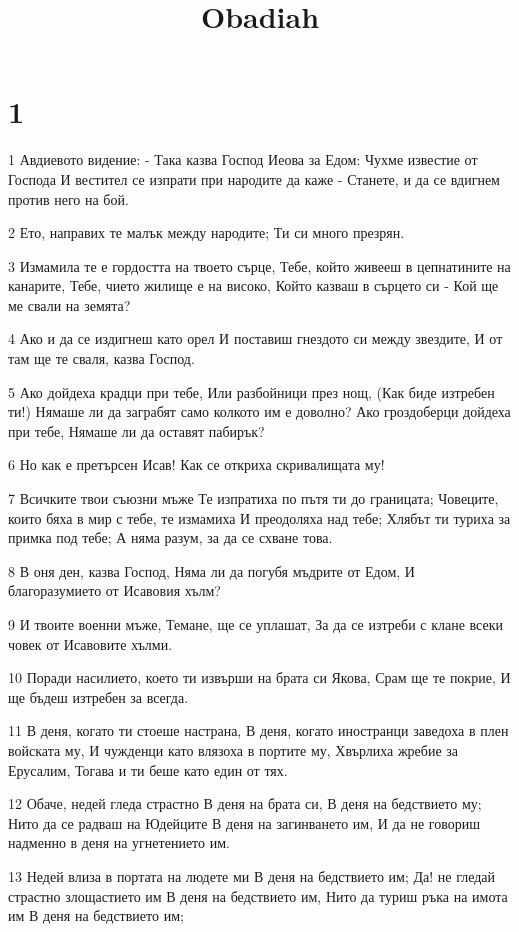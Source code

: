 

\title{Obadiah}


\chapter{1}

\par 1 Авдиевото видение: - Така казва Господ Иеова за Едом: Чухме известие от Господа И вестител се изпрати при народите да каже -  Станете, и да се вдигнем против него на бой.
\par 2 Ето, направих те малък между народите; Ти си много презрян.
\par 3 Измамила те е гордостта на твоето сърце, Тебе, който живееш в цепнатините на канарите, Тебе, чието жилище е на високо, Който казваш в сърцето си -  Кой ще ме свали на земята?
\par 4 Ако и да се издигнеш като орел И поставиш гнездото си между звездите, И от там ще те сваля, казва Господ.
\par 5 Ако дойдеха крадци при тебе, Или разбойници през нощ, (Как биде изтребен ти!) Нямаше ли да заграбят само колкото им е доволно? Ако гроздоберци дойдеха при тебе, Нямаше ли да оставят пабирък?
\par 6 Но как е претърсен Исав! Как се откриха скривалищата му!
\par 7 Всичките твои съюзни мъже Те изпратиха по пътя ти до границата; Човеците, които бяха в мир с тебе, те измамиха И преодоляха над тебе; Хлябът ти туриха за примка под тебе; А няма разум, за да се схване това.
\par 8 В оня ден, казва Господ, Няма ли да погубя мъдрите от Едом, И благоразумието от Исавовия хълм?
\par 9 И твоите военни мъже, Темане, ще се уплашат, За да се изтреби с клане всеки човек от Исавовите хълми.
\par 10 Поради насилието, което ти извърши на брата си Якова, Срам ще те покрие, И ще бъдеш изтребен за всегда.
\par 11 В деня, когато ти стоеше настрана, В деня, когато иностранци заведоха в плен войската му, И чужденци като влязоха в портите му, Хвърлиха жребие за Ерусалим, Тогава и ти беше като един от тях.
\par 12 Обаче, недей гледа страстно В деня на брата си, В деня на бедствието му; Нито да се радваш на Юдейците В деня на загинването им, И да не говориш надменно в деня на угнетението им.
\par 13 Недей влиза в портата на людете ми В деня на бедствието им; Да! не гледай страстно злощастието им В деня на бедствието им, Нито да туриш ръка на имота им В деня на бедствието им;
